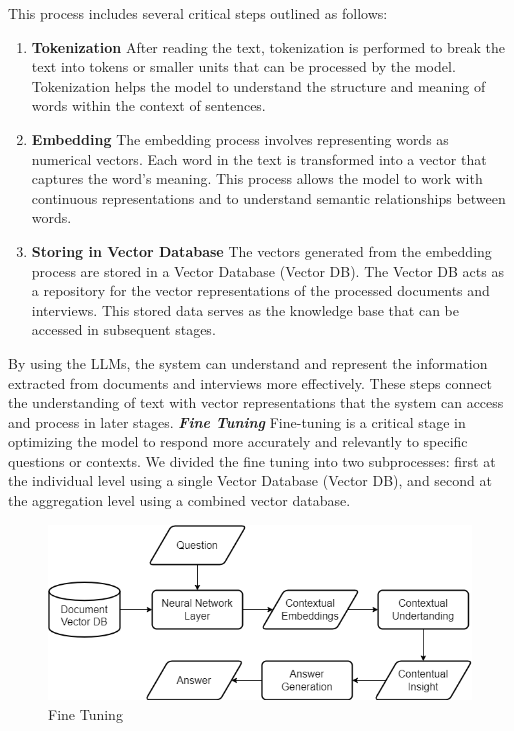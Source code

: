 \documentclass[runningheads]{llncs}
\begin{document}
This process includes several critical steps outlined as follows:

\begin{enumerate}  
    \item \textbf{Tokenization} After reading the text, tokenization is performed to break the text into tokens or smaller units that can be processed by the model. Tokenization helps the model to understand the structure and meaning of words within the context of sentences.
    
    \item \textbf{Embedding} The embedding process involves representing words as numerical vectors. Each word in the text is transformed into a vector that captures the word's meaning. This process allows the model to work with continuous representations and to understand semantic relationships between words.
    
    \item \textbf{Storing in Vector Database} The vectors generated from the embedding process are stored in a Vector Database (Vector DB). The Vector DB acts as a repository for the vector representations of the processed documents and interviews. This stored data serves as the knowledge base that can be accessed in subsequent stages.
\end{enumerate}

By using the LLMs, the system can understand and represent the information extracted from documents and interviews more effectively. These steps connect the understanding of text with vector representations that the system can access and process in later stages. 
\newpage
\textbf{\textit{Fine Tuning}} Fine-tuning is a critical stage in optimizing the model to respond more accurately and relevantly to specific questions or contexts. We divided the fine tuning into two subprocesses: first at the individual level using a single Vector Database (Vector DB), and second at the aggregation level using a combined vector database.

\begin{figure}[htbp]
    \centerline{\includegraphics[scale=0.4]{eng-fine1.png}}
    \caption{Fine Tuning}
    \label{fig:fine-tuning-1}
\end{figure}
\end{document}
